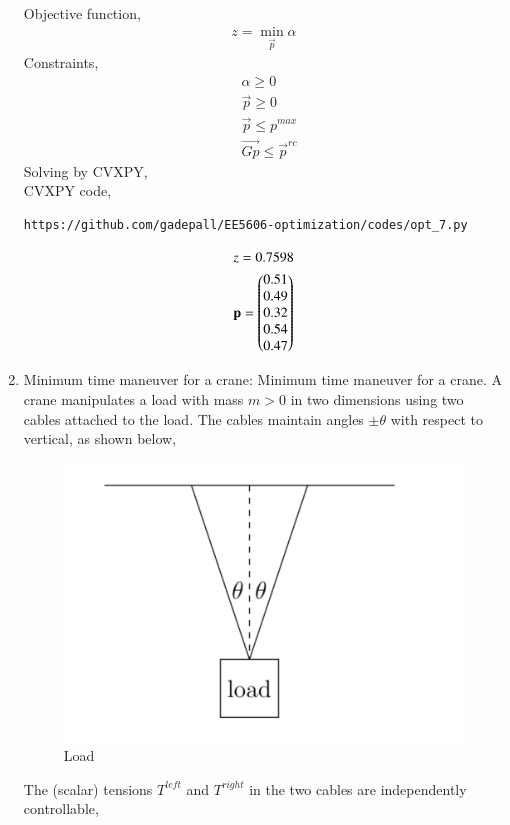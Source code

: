 \documentclass[journal,12pt,twocolumn]{IEEEtran}
\begin{document}
\begin{enumerate}
 Objective function,
 \begin{align}
 z= \min_{\vec{p}} \alpha
 \end{align}
 Constraints,
 \begin{align}
 & \alpha \geq 0\\
 & \vec{p} \geq 0\\
 & \vec{p}\leq p^{max}\\
 &\vec{Gp} \leq \vec{p}^{rc}
 \end{align}
 Solving by CVXPY,\\
 CVXPY code,\\
 \begin{lstlisting}
https://github.com/gadepall/EE5606-optimization/codes/opt_7.py
\end{lstlisting}
\begin{align}
&z=0.7598 \nonumber\\
& \mathbf{p}= \begin{pmatrix}0.51\\0.49\\0.32\\0.54\\0.47\end{pmatrix}\nonumber
\end{align}
\item Minimum time maneuver for a crane: Minimum time maneuver for a crane. A crane manipulates a load with mass $m > 0$ in two dimensions using two cables attached to the load. The cables maintain angles
 $\pm \theta$ with respect to vertical, as shown below,\\
 \begin{figure}[H]
	\centering
    \includegraphics[width=\columnwidth]{load.png}
    \caption{Load}
    \label{}
\end{figure}
The (scalar) tensions $T^{left}$ and $T^{right}$ in the two cables are independently controllable,

\end{enumerate}
\end{document}
